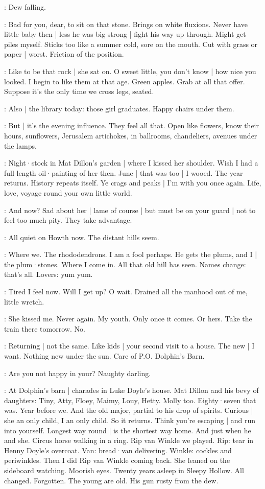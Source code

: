 \BloomCurrent:
Dew falling.

\BloomAbstract:
Bad for you,
dear,
to sit on that stone.
Brings on white fluxions.
Never have little baby then |
less he was big strong |
fight his way up through.
Might get piles myself.
Sticks too like a summer cold,
sore on the mouth.
Cut with grass or paper |
worst.
Friction of the position.

\BloomCurrent:
Like to be that rock |
she sat on.
O sweet little,
you don't know |
how nice you looked.
I begin to like them at that age.
Green apples.
Grab at all that offer.
Suppose it's the only time we cross legs,
seated.

\BloomToday:
Also |
the library today:
those girl graduates.
Happy chairs under them.

\BloomAbstract:
But |
it's the evening influence.
They feel all that.
Open like flowers,
know their hours,
sunflowers,
Jerusalem artichokes,
in ballrooms,
chandeliers,
avenues under the lamps.%

\BloomHist:
Night·stock in Mat Dillon's garden |
where I kissed her shoulder.
Wish I had a full length oil·painting of her then.
June |
that was too |
I wooed.
The year returns.
History repeats itself.
Ye crags and peaks |
I'm with you once again.
Life,
love,
voyage round your own little world.

\BloomCurrent:
And now?
Sad about her |
lame of course |
but must be on your guard |
not to feel too much pity.
They take advantage.

\BloomCurrent:
All quiet on Howth now.
The distant hills seem.

\BloomHist:
Where we.
The rhododendrons.
I am a fool perhaps.
He gets the plums,
and I |
the plum·stones.
Where I come in.
All that old hill has seen.
Names change:
that's all.%
Lovers:
yum yum.

\BloomCurrent:
Tired I feel now.
Will I get up?
O wait.
Drained all the manhood out of me,
little wretch.

\BloomHist:
She kissed me.
Never again.
My youth.
Only once it comes.
Or hers.
Take the train there tomorrow.
No.

\BloomAbstract:
Returning |
not the same.
Like kids |
your second visit to a house.
The new |
I want.
Nothing new under the sun.
Care of P.O. Dolphin's Barn.

\BloomToday:
Are you not happy in your?
Naughty darling.

\BloomHist:
At Dolphin's barn |
charades in Luke Doyle's house.
Mat Dillon and his bevy of daughters:
Tiny,
Atty,
Floey,
Maimy,
Louy,
Hetty.
Molly too.
Eighty·seven that was.
Year before we.
And the old major,
partial to his drop of spirits.
Curious |
she an only child,
I an only child.
So it returns.
Think you're escaping |
and run into yourself.%
Longest way round |
is the shortest way home.
And just when he and she.
Circus horse
walking in a ring.
Rip van Winkle
we played.
Rip: tear in Henny Doyle's overcoat.
Van: bread·van delivering.
Winkle: cockles and periwinkles.
Then I did Rip van Winkle coming back.
She leaned on the sideboard watching.
Moorish eyes.
Twenty years asleep in Sleepy Hollow.
All changed.
Forgotten.
The young are old.
His gun rusty from the dew.

